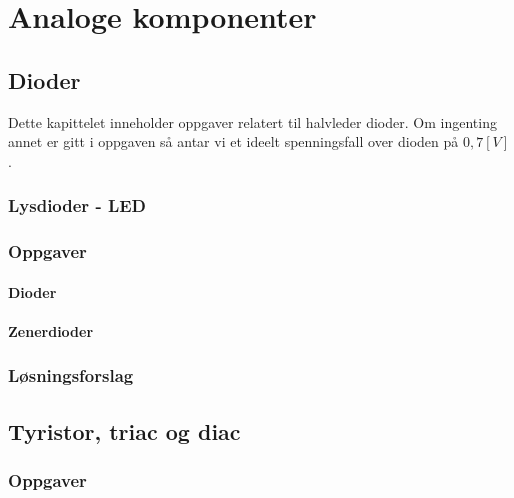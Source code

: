 \documentclass[12pt]{report}
\begin{document}


\tableofcontents



\chapter{Analoge komponenter}

\section{Dioder}


Dette kapittelet inneholder oppgaver relatert til halvleder dioder. Om ingenting annet er gitt i oppgaven så antar vi et ideelt spenningsfall over dioden på $0,7[V]$.\\
\subsection{Lysdioder - LED}


\subsection{Oppgaver}
\subsubsection{Dioder}

\subsubsection{Zenerdioder}


\subsection{Løsningsforslag}
\printsolutions[section]



\newpage

\section{Tyristor, triac og diac}


\subsection{Oppgaver}

\end{document}
